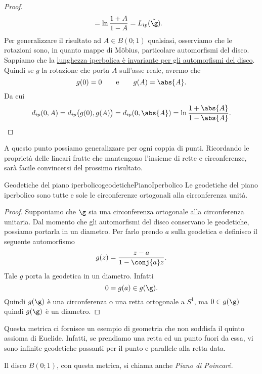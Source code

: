 \begin{proof}
\[\begin{split}
			& = \ln \frac{1+A}{1-A} = L_{ip}(\tilde{\g}).
		\end{split}
	\]
	Per generalizzare il risultato ad \(A\in B(0;1)\) qualsiasi, osserviamo che le rotazioni sono, in quanto mappe di M\"obius, particolare automorfismi del disco. Sappiamo che la \hyperref[th:distanzaIperbolicaInvarianteDisco]{ lunghezza iperbolica è invariante per gli automorfismi del disco}. Quindi se \(g\) la rotazione che porta \(A\) sull'asse reale, avremo che
	\[
		g(0) = 0 \qquad\text{e}\qquad g(A) = \abs{A}.
	\]
	Da cui
	\[
		d_{ip}(0,A) = d_{ip}\big(g(0),g(A)\big) = d_{ip}(0,\abs{A}) = \ln \frac{1+\abs{A}}{1-\abs{A}}.\qedhere
	\]
\end{proof}

\begin{oss}
	A questo punto possiamo generalizzare per ogni coppia di punti. Ricordando le proprietà delle lineari fratte che mantengono l'insieme di rette e circonferenze, sarà facile convincersi del prossimo risultato.
\end{oss}

\begin{teor}{Geodetiche del piano iperbolico}{geodetichePianoIperbolico}
	Le geodetiche del piano iperbolico sono tutte e sole le circonferenze ortogonali alla circonferenza unità.
\end{teor}

\begin{proof}
	Supponiamo che \(\g\) sia una circonferenza ortogonale alla circonferenza unitaria. Dal momento che gli automorfismi del disco conservano le geodetiche, possiamo portarla in un diametro. Per farlo prendo \(a\) sulla geodetica e definisco il seguente automorfismo
	\[
		g(z) = \frac{z-a}{1-\conj{a}z}.
	\]
	Tale \(g\) porta la geodetica in un diametro. Infatti
	\[
		0=g(a) \in g(\g).
	\]
	Quindi \(g(\g)\) è una circonferenza o una retta ortogonale a \(S^1\), ma \(0\in g(\g)\) quindi \(g(\g)\) è un diametro.
\end{proof}

\begin{oss}
	Questa metrica ci fornisce un esempio di geometria che non soddisfa il quinto assioma di Euclide. Infatti, se prendiamo una retta ed un punto fuori da essa, vi sono infinite geodetiche passanti per il punto e parallele alla retta data.
\end{oss}

\begin{notz}
	Il disco \(B(0;1)\), con questa metrica, si chiama anche \emph{Piano di Poincaré}.
\end{notz}
